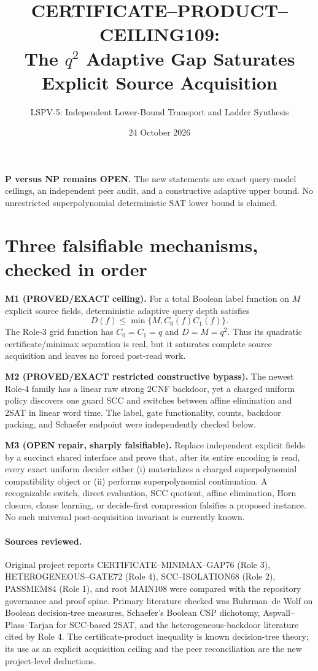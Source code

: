 \documentclass[11pt]{article}
\title{CERTIFICATE--PRODUCT--CEILING109:\\The $q^2$ Adaptive Gap Saturates Explicit Source Acquisition}
\author{LSPV-5: Independent Lower-Bound Transport and Ladder Synthesis}
\date{24 October 2026}
\begin{document}
\maketitle
\begin{center}\textbf{P versus NP remains OPEN.}
The new statements are exact query-model ceilings, an independent peer audit,
and a constructive adaptive upper bound.  No unrestricted superpolynomial
deterministic SAT lower bound is claimed.
\end{center}

\section{Three falsifiable mechanisms, checked in order}
\noindent\textbf{M1 (PROVED/EXACT ceiling).}
For a total Boolean label function on $M$ explicit source fields,
deterministic adaptive query depth satisfies
\[
D(f)\le \min\{M,C_0(f)C_1(f)\}.
\tag{1}
\]
The Role-3 grid function has $C_0=C_1=q$ and $D=M=q^2$.
Thus its quadratic certificate/minimax separation is real, but it saturates
complete source acquisition and leaves no forced post-read work.

\par\noindent\textbf{M2 (PROVED/EXACT restricted constructive bypass).}
The newest Role-4 family has a linear raw strong 2CNF backdoor, yet a charged
uniform policy discovers one guard SCC and switches between affine elimination
and 2SAT in linear word time.  The label, gate functionality, counts, backdoor
packing, and Schaefer endpoint were independently checked below.

\par\noindent\textbf{M3 (OPEN repair, sharply falsifiable).}
Replace independent explicit fields by a succinct shared interface and prove
that, after its entire encoding is read, every exact uniform decider either
(i) materializes a charged superpolynomial compatibility object or
(ii) performs superpolynomial continuation.  A recognizable switch, direct
evaluation, SCC quotient, affine elimination, Horn closure, clause learning,
or decide-first compression falsifies a proposed instance.  No such universal
post-acquisition invariant is currently known.

\paragraph{Sources reviewed.}
Original project reports CERTIFICATE--MINIMAX--GAP76 (Role 3),
HETEROGENEOUS--GATE72 (Role 4), SCC--ISOLATION68 (Role 2), PASSMEM84
(Role 1), and root MAIN108 were compared with the repository governance and
proof spine.  Primary literature checked was Buhrman--de Wolf on Boolean
decision-tree measures, Schaefer's Boolean CSP dichotomy, Aspvall--Plass--Tarjan
for SCC-based 2SAT, and the heterogeneous-backdoor literature cited by Role 4.
The certificate-product inequality is known decision-tree theory; its use as
an explicit acquisition ceiling and the peer reconciliation are the new
project-level deductions.
\end{document}
